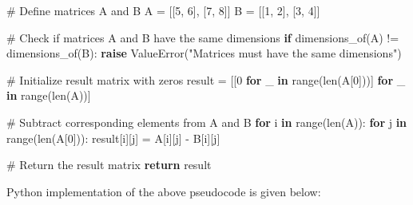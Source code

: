 \documentclass[
  letterpaper,
  DIV=11,
  numbers=noendperiod]{scrreprt}
\newenvironment{Shaded}{\begin{snugshade}}{\end{snugshade}}
\newcommand{\BuiltInTok}[1]{\textcolor[rgb]{0.00,0.23,0.31}{#1}}
\newcommand{\CommentTok}[1]{\textcolor[rgb]{0.37,0.37,0.37}{#1}}
\newcommand{\ControlFlowTok}[1]{\textcolor[rgb]{0.00,0.23,0.31}{\textbf{#1}}}
\newcommand{\DecValTok}[1]{\textcolor[rgb]{0.68,0.00,0.00}{#1}}
\newcommand{\KeywordTok}[1]{\textcolor[rgb]{0.00,0.23,0.31}{\textbf{#1}}}
\newcommand{\NormalTok}[1]{\textcolor[rgb]{0.00,0.23,0.31}{#1}}
\newcommand{\OperatorTok}[1]{\textcolor[rgb]{0.37,0.37,0.37}{#1}}
\newcommand{\PreprocessorTok}[1]{\textcolor[rgb]{0.68,0.00,0.00}{#1}}
\newcommand{\StringTok}[1]{\textcolor[rgb]{0.13,0.47,0.30}{#1}}
\theoremstyle{plain}
\theoremstyle{definition}
\theoremstyle{remark}
\begin{document}
\begin{Shaded}
\begin{Highlighting}[]
\CommentTok{\# Define matrices A and B}
\NormalTok{A }\OperatorTok{=}\NormalTok{ [[}\DecValTok{5}\NormalTok{, }\DecValTok{6}\NormalTok{], [}\DecValTok{7}\NormalTok{, }\DecValTok{8}\NormalTok{]]}
\NormalTok{B }\OperatorTok{=}\NormalTok{ [[}\DecValTok{1}\NormalTok{, }\DecValTok{2}\NormalTok{], [}\DecValTok{3}\NormalTok{, }\DecValTok{4}\NormalTok{]]}

\CommentTok{\# Check if matrices A and B have the same dimensions}
\ControlFlowTok{if}\NormalTok{ dimensions\_of(A) }\OperatorTok{!=}\NormalTok{ dimensions\_of(B):}
    \ControlFlowTok{raise} \PreprocessorTok{ValueError}\NormalTok{(}\StringTok{"Matrices must have the same dimensions"}\NormalTok{)}

\CommentTok{\# Initialize result matrix with zeros}
\NormalTok{result }\OperatorTok{=}\NormalTok{ [[}\DecValTok{0} \ControlFlowTok{for}\NormalTok{ \_ }\KeywordTok{in} \BuiltInTok{range}\NormalTok{(}\BuiltInTok{len}\NormalTok{(A[}\DecValTok{0}\NormalTok{]))] }\ControlFlowTok{for}\NormalTok{ \_ }\KeywordTok{in} \BuiltInTok{range}\NormalTok{(}\BuiltInTok{len}\NormalTok{(A))]}

\CommentTok{\# Subtract corresponding elements from A and B}
\ControlFlowTok{for}\NormalTok{ i }\KeywordTok{in} \BuiltInTok{range}\NormalTok{(}\BuiltInTok{len}\NormalTok{(A)):}
    \ControlFlowTok{for}\NormalTok{ j }\KeywordTok{in} \BuiltInTok{range}\NormalTok{(}\BuiltInTok{len}\NormalTok{(A[}\DecValTok{0}\NormalTok{])):}
\NormalTok{        result[i][j] }\OperatorTok{=}\NormalTok{ A[i][j] }\OperatorTok{{-}}\NormalTok{ B[i][j]}

\CommentTok{\# Return the result matrix}
\ControlFlowTok{return}\NormalTok{ result}
\end{Highlighting}
\end{Shaded}

Python implementation of the above pseudocode is given below:
\end{document}
